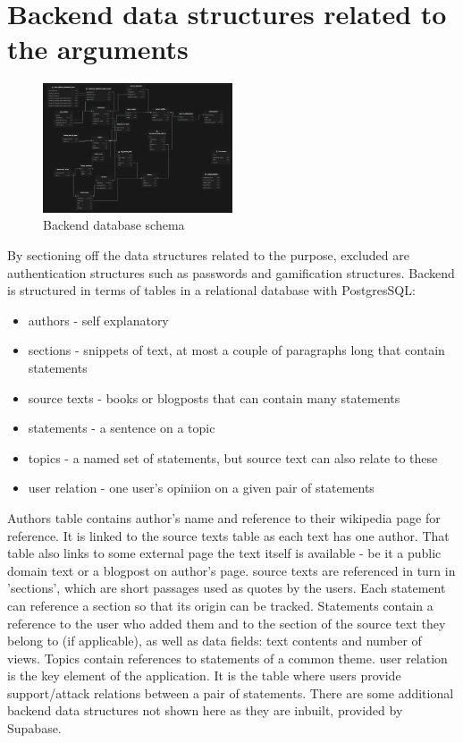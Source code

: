 \documentclass{report}
\begin{document}
\section{Backend data structures related to the arguments}

\begin{figure}[h]
    \centering
    \includegraphics[width=0.5\textwidth]{./images/Supabase-Schema-2.png}
    \caption{Backend database schema}
\end{figure}

By sectioning off the data structures related to the purpose, excluded are authentication structures such as passwords and gamification structures.
Backend is structured in terms of tables in a relational database with PostgresSQL:
\begin{itemize}
  \item authors - self explanatory
  \item sections - snippets of text, at most a couple of paragraphs long that contain statements
  \item source texts - books or blogposts that can contain many statements
  \item statements - a sentence on a topic
  \item topics - a named set of statements, but source text can also relate to these
  \item user relation - one user's opiniion on a given pair of statements
\end{itemize}
Authors table contains author's name and reference to their wikipedia page for reference. It is linked to the source texts table as each text has one author. That table also links to some external page the text itself is available - be it a public domain text or a blogpost on author's page. source texts are referenced in turn in 'sections', which are short passages used as quotes by the users.
Each statement can reference a section so that its origin can be tracked. Statements contain a reference to the user who added them and to the section of the source text they belong to (if applicable), as well as data fields: text contents and number of views. Topics contain references to statements of a common theme.
user relation is the key element of the application. It is the table where users provide support/attack relations between a pair of statements. 
There are some additional backend data structures not shown here as they are inbuilt, provided by Supabase.
\end{document}
